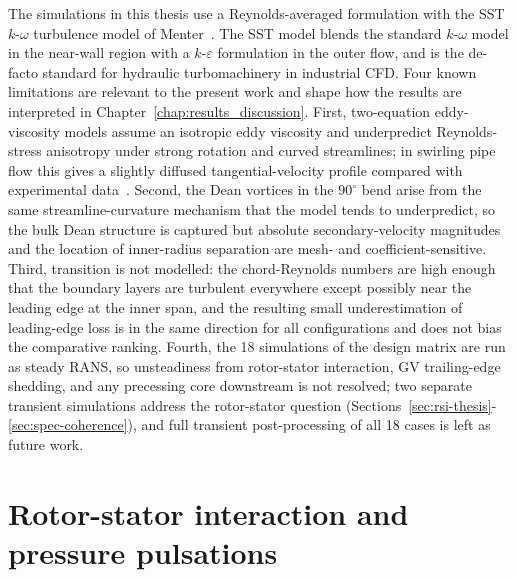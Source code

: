 The simulations in this thesis use a Reynolds-averaged formulation with the SST $k$-$\omega$ turbulence model of Menter~\cite{Menter1994}. The SST model blends the standard $k$-$\omega$ model in the near-wall region with a $k$-$\varepsilon$ formulation in the outer flow, and is the de-facto standard for hydraulic turbomachinery in industrial CFD. Four known limitations are relevant to the present work and shape how the results are interpreted in Chapter~\ref{chap:results_discussion}. First, two-equation eddy-viscosity models assume an isotropic eddy viscosity and underpredict Reynolds-stress anisotropy under strong rotation and curved streamlines; in swirling pipe flow this gives a slightly diffused tangential-velocity profile compared with experimental data~\cite{EscueCui2010}. Second, the Dean vortices in the $90^\circ$ bend arise from the same streamline-curvature mechanism that the model tends to underpredict, so the bulk Dean structure is captured but absolute secondary-velocity magnitudes and the location of inner-radius separation are mesh- and coefficient-sensitive. Third, transition is not modelled: the chord-Reynolds numbers are high enough that the boundary layers are turbulent everywhere except possibly near the leading edge at the inner span, and the resulting small underestimation of leading-edge loss is in the same direction for all configurations and does not bias the comparative ranking. Fourth, the 18 simulations of the design matrix are run as steady RANS, so unsteadiness from rotor-stator interaction, GV trailing-edge shedding, and any precessing core downstream is not resolved; two separate transient simulations address the rotor-stator question (Sections~\ref{sec:rsi-thesis}-\ref{sec:spec-coherence}), and full transient post-processing of all 18 cases is left as future work.

\section{Rotor-stator interaction and pressure pulsations}
\label{sec:rsi}
 
